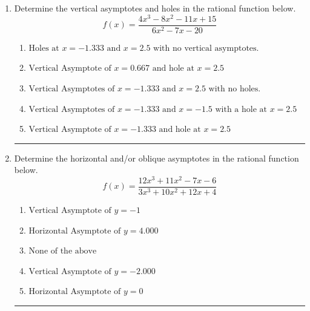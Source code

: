 \documentclass[14pt]{extbook}
\newcommand{\litem}[1]{\item#1\hspace*{-1cm}\rule{\textwidth}{0.4pt}}
\begin{document}
\begin{enumerate}
{\begin{enumerate}[label=\Alph*.]
\end{enumerate} }
\litem{
Determine the vertical asymptotes and holes in the rational function below.\[ f(x) = \frac{4x^{3} -8 x^{2} -11 x + 15}{6x^{2} -7 x -20} \]\begin{enumerate}[label=\Alph*.]
\item \( \text{Holes at } x = -1.333 \text{ and } x = 2.5 \text{ with no vertical asymptotes.} \)
\item \( \text{Vertical Asymptote of } x = 0.667 \text{ and hole at } x = 2.5 \)
\item \( \text{Vertical Asymptotes of } x = -1.333 \text{ and } x = 2.5 \text{ with no holes.} \)
\item \( \text{Vertical Asymptotes of } x = -1.333 \text{ and } x = -1.5 \text{ with a hole at } x = 2.5 \)
\item \( \text{Vertical Asymptote of } x = -1.333 \text{ and hole at } x = 2.5 \)

\end{enumerate} }
\litem{
Determine the horizontal and/or oblique asymptotes in the rational function below.\[ f(x) = \frac{12x^{3} +11 x^{2} -7 x -6}{3x^{3} +10 x^{2} +12 x + 4} \]\begin{enumerate}[label=\Alph*.]
\item \( \text{Vertical Asymptote of } y = -1  \)
\item \( \text{Horizontal Asymptote of } y = 4.000  \)
\item \( \text{None of the above} \)
\item \( \text{Vertical Asymptote of } y = -2.000  \)
\item \( \text{Horizontal Asymptote of } y = 0  \)

\end{enumerate} }
\end{enumerate}
\end{document}
